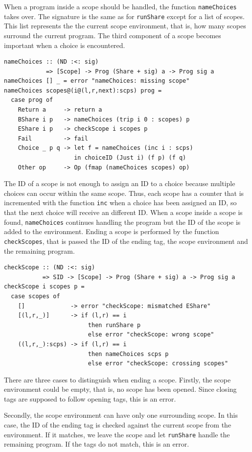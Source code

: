 \documentclass[a4paper, 11pt, fleqn, twoside, abstract=on]{scrreprt}
\newcommand{\hinl}[1]{\texttt{#1}}
\begin{document}
When a program inside a scope should be handled, the function \hinl{nameChoices} takes over.
The signature is the same as for \hinl{runShare} except for a list of scopes.
This list represents the the current scope environment, that is, how many scopes surround the current program.
The third component of a scope becomes important when a choice is encountered.

\begin{verbatim}
nameChoices :: (ND :<: sig)
            => [Scope] -> Prog (Share + sig) a -> Prog sig a
nameChoices [] _ = error "nameChoices: missing scope"
nameChoices scopes@(i@(l,r,next):scps) prog =
  case prog of
    Return a     -> return a
    BShare i p   -> nameChoices (trip i 0 : scopes) p
    EShare i p   -> checkScope i scopes p
    Fail         -> fail
    Choice _ p q -> let f = nameChoices (inc i : scps)
                    in choiceID (Just i) (f p) (f q)
    Other op     -> Op (fmap (nameChoices scopes) op)
\end{verbatim}

The ID of a scope is not enough to assign an ID to a choice because multiple choices can occur within the same scope.
Thus, each scope has a counter that is incremented with the function \hinl{inc} when a choice has been assigned an ID, so that the next choice will receive an different ID.
When a scope inside a scope is found, \hinl{nameChoices} continues handling the program but the ID of the scope is added to the environment.
Ending a scope is performed by the function \hinl{checkScopes}, that is passed the ID of the ending tag, the scope environment and the remaining program.

\begin{verbatim}
checkScope :: (ND :<: sig)
           => SID -> [Scope] -> Prog (Share + sig) a -> Prog sig a
checkScope i scopes p =
  case scopes of
    []             -> error "checkScope: mismatched EShare"
    [(l,r,_)]      -> if (l,r) == i
                        then runShare p
                        else error "checkScope: wrong scope"
    ((l,r,_):scps) -> if (l,r) == i
                        then nameChoices scps p
                        else error "checkScope: crossing scopes"
\end{verbatim}

There are three cases to distinguish when ending a scope.
Firstly, the scope environment could be empty, that is, no scope has been opened.
Since closing tags are supposed to follow opening tags, this is an error.

Secondly, the scope environment can have only one surrounding scope.
In this case, the ID of the ending tag is checked against the current scope from the environment.
If it matches, we leave the scope and let \hinl{runShare} handle the remaining program.
If the tags do not match, this is an error.
\end{document}
